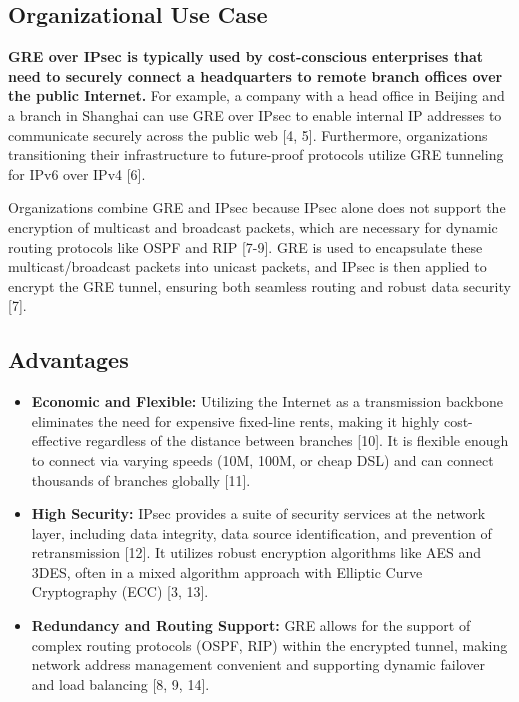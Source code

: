 \documentclass[conference]{IEEEtran}
\begin{document}
\subsection{Organizational Use Case}
\textbf{GRE over IPsec is typically used by cost-conscious enterprises that need to securely connect a headquarters to remote branch offices over the public Internet.} For example, a company with a head office in Beijing and a branch in Shanghai can use GRE over IPsec to enable internal IP addresses to communicate securely across the public web [4, 5]. Furthermore, organizations transitioning their infrastructure to future-proof protocols utilize GRE tunneling for IPv6 over IPv4 [6]. 

Organizations combine GRE and IPsec because IPsec alone does not support the encryption of multicast and broadcast packets, which are necessary for dynamic routing protocols like OSPF and RIP [7-9]. GRE is used to encapsulate these multicast/broadcast packets into unicast packets, and IPsec is then applied to encrypt the GRE tunnel, ensuring both seamless routing and robust data security [7].

\subsection{Advantages}
\begin{itemize}
    \item \textbf{Economic and Flexible:} Utilizing the Internet as a transmission backbone eliminates the need for expensive fixed-line rents, making it highly cost-effective regardless of the distance between branches [10]. It is flexible enough to connect via varying speeds (10M, 100M, or cheap DSL) and can connect thousands of branches globally [11].
    \item \textbf{High Security:} IPsec provides a suite of security services at the network layer, including data integrity, data source identification, and prevention of retransmission [12]. It utilizes robust encryption algorithms like AES and 3DES, often in a mixed algorithm approach with Elliptic Curve Cryptography (ECC) [3, 13].
    \item \textbf{Redundancy and Routing Support:} GRE allows for the support of complex routing protocols (OSPF, RIP) within the encrypted tunnel, making network address management convenient and supporting dynamic failover and load balancing [8, 9, 14].
\end{itemize}
\end{document}
